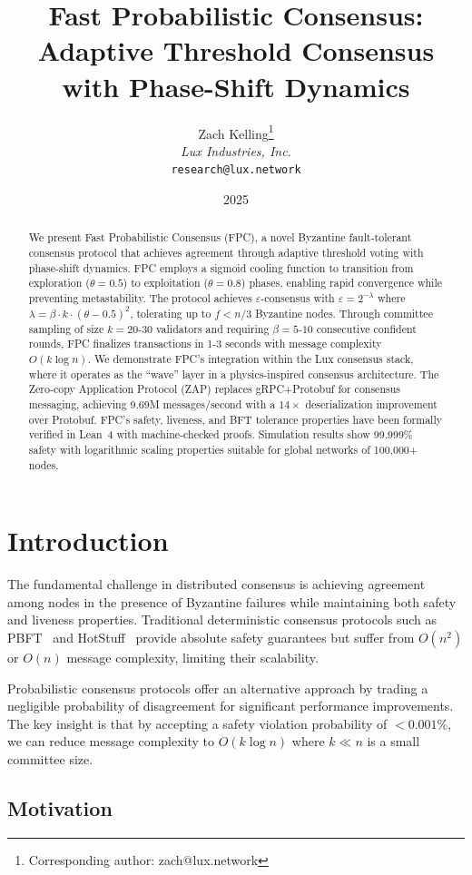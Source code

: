 \documentclass[11pt,a4paper]{article}
\title{Fast Probabilistic Consensus: Adaptive Threshold Consensus with Phase-Shift Dynamics}
\author{
Zach Kelling\thanks{Corresponding author: zach@lux.network}\\
\textit{Lux Industries, Inc.}\\
\texttt{research@lux.network}
}
\date{2025}
\begin{document}
\luxcoverpage

\begin{abstract}
We present Fast Probabilistic Consensus (FPC), a novel Byzantine fault-tolerant consensus protocol that achieves agreement through adaptive threshold voting with phase-shift dynamics. FPC employs a sigmoid cooling function to transition from exploration ($\theta = 0.5$) to exploitation ($\theta = 0.8$) phases, enabling rapid convergence while preventing metastability. The protocol achieves $\varepsilon$-consensus with $\varepsilon = 2^{-\lambda}$ where $\lambda = \beta \cdot k \cdot (\theta - 0.5)^2$, tolerating up to $f < n/3$ Byzantine nodes. Through committee sampling of size $k = 20$-$30$ validators and requiring $\beta = 5$-$10$ consecutive confident rounds, FPC finalizes transactions in 1-3 seconds with message complexity $O(k \log n)$. We demonstrate FPC's integration within the Lux consensus stack, where it operates as the ``wave'' layer in a physics-inspired consensus architecture. The Zero-copy Application Protocol (ZAP) replaces gRPC+Protobuf for consensus messaging, achieving 9.69M messages/second with a $14\times$ deserialization improvement over Protobuf. FPC's safety, liveness, and BFT tolerance properties have been formally verified in Lean~4 with machine-checked proofs. Simulation results show 99.999\% safety with logarithmic scaling properties suitable for global networks of 100,000+ nodes.
\end{abstract}

\section{Introduction}

The fundamental challenge in distributed consensus is achieving agreement among nodes in the presence of Byzantine failures while maintaining both safety and liveness properties. Traditional deterministic consensus protocols such as PBFT~\cite{castro1999practical} and HotStuff~\cite{yin2019hotstuff} provide absolute safety guarantees but suffer from $O(n^2)$ or $O(n)$ message complexity, limiting their scalability.

Probabilistic consensus protocols offer an alternative approach by trading a negligible probability of disagreement for significant performance improvements. The key insight is that by accepting a safety violation probability of $< 0.001\%$, we can reduce message complexity to $O(k \log n)$ where $k \ll n$ is a small committee size.

\subsection{Motivation}
\end{document}
